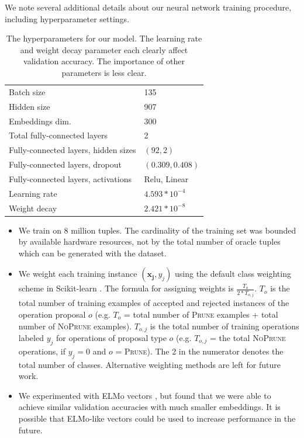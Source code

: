 We note several additional details about our neural network training procedure, including hyperparameter settings.


\begin{table}[htb!]
\begin{tabular}{@{}ll@{}}
\toprule
Batch size         & 135                      \\ 
Hidden size        & 907                        \\
Embeddings dim.    & 300                      \\
Total fully-connected layers & 2                        \\
Fully-connected layers, hidden sizes & $(92, 2)$ \\
Fully-connected layers, dropout & $(0.309, 0.408)$ \\
Fully-connected layers, activations        & Relu, Linear             \\
Learning rate      & $4.593 * 10^{-4}$   \\
Weight decay       & $2.421 * 10^{-8}$   \\ \bottomrule
\end{tabular}
\caption{The hyperparameters for our model. The learning rate and weight decay parameter each clearly affect validation accuracy. The importance of other parameters is less clear. } 
\end{table}

\begin{itemize}
\item{We train on 8 million tuples. The cardinality of the training set was bounded by available hardware resources, not by the total number of oracle tuples which can be generated with the \citet{filippova2013overcoming} dataset.}
\item{We weight each training instance $(\bm{x_j}, y_j)$ using the default class weighting scheme in Scikit-learn \cite{Pedregosa:2011:SML:1953048.2078195}. The formula for assigning weights is $\frac{T_o}{2 * T_{o,j}}$. $T_o$ is the total number of training examples of accepted and rejected instances of the operation proposal $o$ (e.g. $T_o$ = total number of \textsc{Prune} examples + total number of \textsc{NoPrune} examples). $T_{o,j}$ is the total number of training operations labeled $y_j$ for operations of proposal type $o$ (e.g. $T_{o,j}$ = the total \textsc{NoPrune} operations, if $y_j=0$ and $o$ = \textsc{Prune}). The 2 in the numerator denotes the total number of classes. Alternative weighting methods are left for future work.}
\item{We experimented with ELMo vectors \cite{Peters:2018}, but found that we were able to achieve similar validation accuracies with much smaller embeddings. It is possible that ELMo-like vectors could be used to increase performance in the future.}
\end{itemize}


